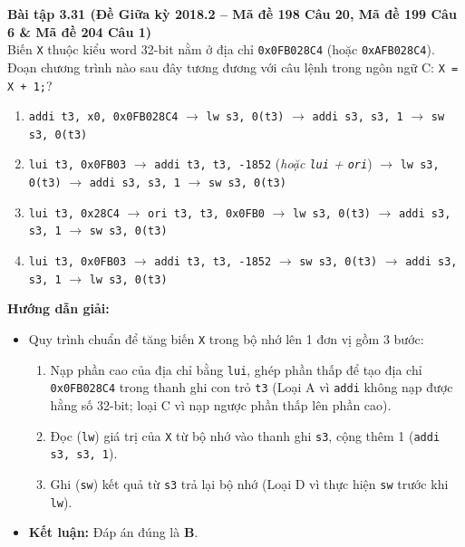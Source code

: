 \textbf{Bài tập 3.31 (Đề Giữa kỳ 2018.2 -- Mã đề 198 Câu 20, Mã đề 199 Câu 6 \& Mã đề 204 Câu 1)}\\
Biến \texttt{X} thuộc kiểu word 32-bit nằm ở địa chỉ \texttt{0x0FB028C4} (hoặc \texttt{0xAFB028C4}). Đoạn chương trình nào sau đây tương đương với câu lệnh trong ngôn ngữ C: \texttt{X = X + 1;}?
\begin{enumerate}[label=\Alph*.]
    \item \texttt{addi t3, x0, 0x0FB028C4} $\rightarrow$ \texttt{lw s3, 0(t3)} $\rightarrow$ \texttt{addi s3, s3, 1} $\rightarrow$ \texttt{sw s3, 0(t3)}
    \item \texttt{lui t3, 0x0FB03} $\rightarrow$ \texttt{addi t3, t3, -1852} (\textit{hoặc \texttt{lui} + \texttt{ori}}) $\rightarrow$ \texttt{lw s3, 0(t3)} $\rightarrow$ \texttt{addi s3, s3, 1} $\rightarrow$ \texttt{sw s3, 0(t3)}
    \item \texttt{lui t3, 0x28C4} $\rightarrow$ \texttt{ori t3, t3, 0x0FB0} $\rightarrow$ \texttt{lw s3, 0(t3)} $\rightarrow$ \texttt{addi s3, s3, 1} $\rightarrow$ \texttt{sw s3, 0(t3)}
    \item \texttt{lui t3, 0x0FB03} $\rightarrow$ \texttt{addi t3, t3, -1852} $\rightarrow$ \texttt{sw s3, 0(t3)} $\rightarrow$ \texttt{addi s3, s3, 1} $\rightarrow$ \texttt{lw s3, 0(t3)}
\end{enumerate}
\textbf{Hướng dẫn giải:}
\begin{itemize}
    \item Quy trình chuẩn để tăng biến \texttt{X} trong bộ nhớ lên 1 đơn vị gồm 3 bước:
    \begin{enumerate}
        \item Nạp phần cao của địa chỉ bằng \texttt{lui}, ghép phần thấp để tạo địa chỉ \texttt{0x0FB028C4} trong thanh ghi con trỏ \texttt{t3} (Loại A vì \texttt{addi} không nạp được hằng số 32-bit; loại C vì nạp ngược phần thấp lên phần cao).
        \item Đọc (\texttt{lw}) giá trị của \texttt{X} từ bộ nhớ vào thanh ghi \texttt{s3}, cộng thêm 1 (\texttt{addi s3, s3, 1}).
        \item Ghi (\texttt{sw}) kết quả từ \texttt{s3} trả lại bộ nhớ (Loại D vì thực hiện \texttt{sw} trước khi \texttt{lw}).
    \end{enumerate}
    \item \textbf{Kết luận:} Đáp án đúng là \textbf{B}.
\end{itemize}

